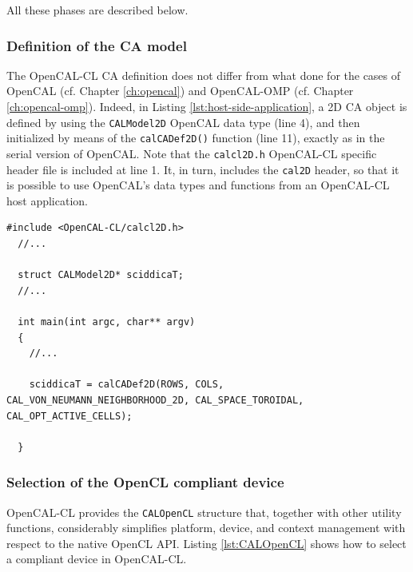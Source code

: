 All these phases are described below.

\subsubsection{Definition of the CA model}

The OpenCAL-CL CA definition does not differ from what done for the
cases of OpenCAL (cf. Chapter \ref{ch:opencal}) and OpenCAL-OMP
(cf. Chapter \ref{ch:opencal-omp}). Indeed, in Listing
\ref{lst:host-side-application}, a 2D CA object is defined by using
the \verb'CALModel2D' OpenCAL data type (line 4), and then initialized
by means of the \verb'calCADef2D()' function (line 11), exactly as in
the serial version of OpenCAL. Note that the \verb'calcl2D.h'
OpenCAL-CL specific header file is included at line 1. It, in turn,
includes the \verb'cal2D' header, so that it is possible to use
OpenCAL's data types and functions from an OpenCAL-CL host
application.

\begin{lstlisting}[float,floatplacement=H, label=lst:host-side-application, caption={An example of OpenCAL-CL host-side application.}] 
  #include <OpenCAL-CL/calcl2D.h>
  //...

  struct CALModel2D* sciddicaT;
  //...
  
  int main(int argc, char** argv)
  {
    //...

    sciddicaT = calCADef2D(ROWS, COLS, CAL_VON_NEUMANN_NEIGHBORHOOD_2D, CAL_SPACE_TOROIDAL, CAL_OPT_ACTIVE_CELLS);

  }
\end{lstlisting}


\subsubsection{Selection of the OpenCL compliant device}

OpenCAL-CL provides the \verb'CALOpenCL' structure that, together with
other utility functions, considerably simplifies platform, device, and
context management with respect to the native OpenCL API. Listing
\ref{lst:CALOpenCL} shows how to select a compliant device in
OpenCAL-CL.

